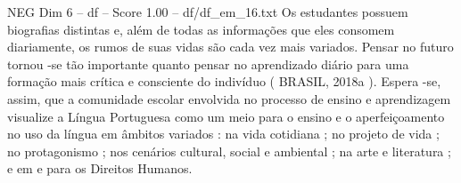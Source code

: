 \begin{textsample}{NEG Dim 6 – df – Score 1.00 – df/df\_em\_16.txt}
Os estudantes possuem biografias distintas e, além de todas as informações que eles consomem diariamente, os rumos de suas vidas são cada vez mais variados.
Pensar no futuro tornou -se tão importante quanto pensar no aprendizado diário para uma formação mais crítica e consciente do indivíduo ( BRASIL, 2018a ).
Espera -se, assim, que a comunidade escolar envolvida no processo de ensino e aprendizagem visualize a Língua Portuguesa como um meio para o ensino e o aperfeiçoamento no uso da língua em âmbitos variados : na vida cotidiana ; no projeto de vida ; no protagonismo ; nos cenários cultural, social e ambiental ; na arte e literatura ; e em e para os Direitos Humanos.

\end{textsample}
